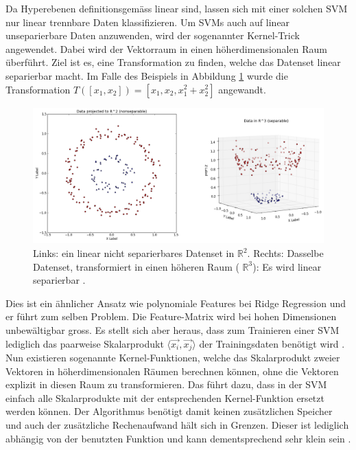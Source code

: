 \documentclass[10pt, a4paper]{article}
\begin{document}
Da Hyperebenen definitionsgemäss linear sind, lassen sich mit einer solchen \ac{SVM} nur linear trennbare Daten klassifizieren. Um \acp{SVM} auch auf linear unseparierbare Daten anzuwenden, wird der sogenannter Kernel-Trick angewendet. Dabei wird der Vektorraum in einen höherdimensionalen Raum überführt. Ziel ist es, eine Transformation zu finden, welche das Datenset linear separierbar macht. Im Falle des Beispiels in Abbildung \ref{fig:svr_2d_to_3d} wurde die Transformation \(T([x_1, x_2]) = [x_1, x_2, x_1^2 + x_2^2]\) angewandt.

\begin{figure}[h]
	\centering
	\includegraphics[width=0.7\linewidth]{resources/images/svr_2d_to_3d}
	\caption{Links: ein linear nicht separierbares Datenset in \(\mathbb{R}^2\). Rechts: Dasselbe Datenset, transformiert in einen höheren Raum ( \(\mathbb{R}^3\)): Es wird linear separierbar \cite{erickimkerneltrick}.}
	\label{fig:svr_2d_to_3d}
\end{figure}

Dies ist ein ähnlicher Ansatz wie polynomiale Features bei Ridge Regression und er führt zum selben Problem. Die Feature-Matrix wird bei hohen Dimensionen unbewältigbar gross. Es stellt sich aber heraus, dass zum Trainieren einer \ac{SVM} lediglich das paarweise Skalarprodukt \(\langle \vec{x_i}, \vec{x_j} \rangle\) der Trainingsdaten benötigt wird \cite{berkeleykerneltrick}. Nun existieren sogenannte Kernel-Funktionen, welche das Skalarprodukt zweier Vektoren in höherdimensionalen Räumen berechnen können, ohne die Vektoren explizit in diesen Raum zu transformieren. Das führt dazu, dass in der \ac{SVM} einfach alle Skalarprodukte mit der entsprechenden Kernel-Funktion ersetzt werden können. Der Algorithmus benötigt damit keinen zusätzlichen Speicher und auch der zusätzliche Rechenaufwand hält sich in Grenzen. Dieser ist lediglich abhängig von der benutzten Funktion und kann dementsprechend sehr klein sein \cite{erickimkerneltrick}.
\end{document}
